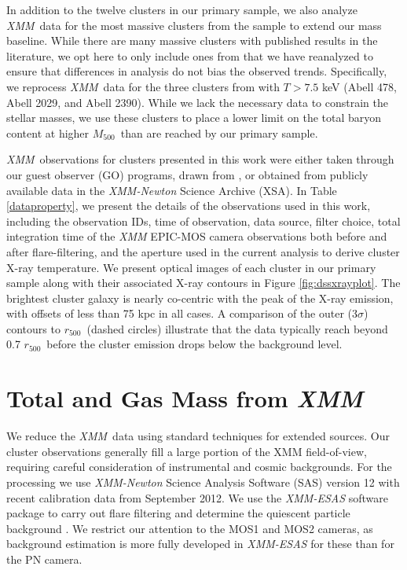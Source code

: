 \documentclass[preprint]{emulateapj}
\newcommand\rfive{$r_{500}$}
\newcommand\mfive{${M}_{500}$}
\newcommand{\xmm}{\textit{XMM}}
\begin{document}
In addition to the twelve clusters in our primary sample, we also
analyze \xmm\ data for the most massive clusters from the
\citet{vikhlinin2006} sample to extend our mass baseline. While there
are many massive clusters with published results in the literature, we
opt here to only include ones from \citet{vikhlinin2006} that we have
reanalyzed to ensure that differences in analysis do not bias the
observed trends. Specifically, we reprocess \xmm\ data for the three
clusters from \citet{vikhlinin2006} with $T>7.5$ keV (Abell 478, Abell
2029, and Abell 2390).  While we lack the necessary data to constrain
the stellar masses, we use these clusters to place a lower limit on
the total baryon content at higher \mfive\ than are reached by our
primary sample.


\xmm\ observations for clusters presented in this work were either
taken through our guest observer (GO) programs, drawn from
\citet{sanderson2013}, or obtained from publicly available data in the
{\it XMM-Newton} Science Archive (XSA).  In Table \ref{dataproperty},
we present the details of the observations used in this work,
including the observation IDs, time of observation, data source,
filter choice, total integration time of the {\it XMM} EPIC-MOS camera
observations both before and after flare-filtering, and the aperture
used in the current analysis to derive cluster X-ray temperature.  We
present optical images of each cluster in our primary sample along
with their associated X-ray contours in Figure
\ref{fig:dssxrayplot}. The brightest cluster galaxy is nearly
co-centric with the peak of the X-ray emission, with offsets of less
than 75 kpc in all cases. A comparison of the outer (3$\sigma$)
contours to \rfive\ (dashed circles) illustrate that the data
typically reach beyond 0.7 \rfive\ before the cluster emission drops
below the background level.




\section{Total and Gas Mass from \xmm}
\label{sec:totalandgasmass}

We reduce the \xmm\ data using standard techniques for extended
sources. Our cluster observations generally fill a large portion of
the XMM field-of-view, requiring careful consideration of instrumental
and cosmic backgrounds.  For the processing we use \emph{XMM-Newton}
Science Analysis Software (SAS) version 12 with recent calibration
data from September 2012. We use the \emph{XMM-ESAS} software package
to carry out flare filtering and determine the quiescent particle
background \citep[see][for full details on \xmm\
backgrounds]{snowden2008}.  We restrict our attention to the MOS1 and
MOS2 cameras, as background estimation is more fully developed in
\emph{XMM-ESAS} for these than for the PN camera.
\end{document}
